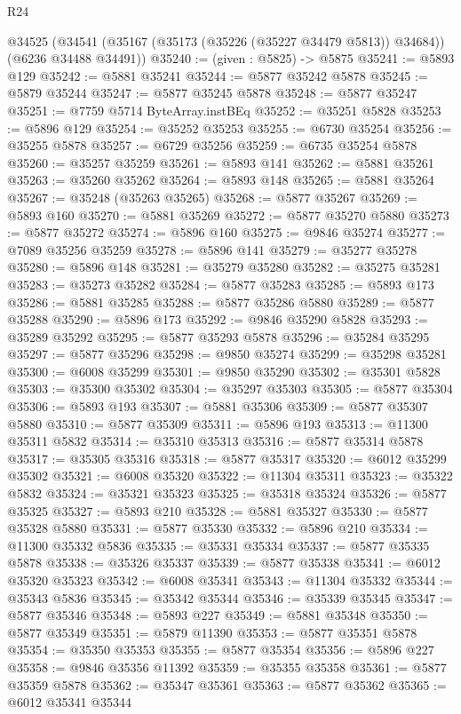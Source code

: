 \begin{lexlean}{R24}
\begin{coremodule}
  @34525 (@34541 (@35167 (@35173 (@35226 (@35227 @34479 @5813)) @34684)) (@6236 @34488 @34491))
@35240 := (given : @5825) -> @5875
@35241 := @5893 @129
@35242 := @5881 @35241
@35244 := @5877 @35242 @5878
@35245 := @5879 @35244
@35247 := @5877 @35245 @5878
@35248 := @5877 @35247
@35251 := @7759 @5714 ByteArray.instBEq
@35252 := @35251 @5828
@35253 := @5896 @129
@35254 := @35252 @35253
@35255 := @6730 @35254
@35256 := @35255 @5878
@35257 := @6729 @35256
@35259 := @6735 @35254 @5878
@35260 := @35257 @35259
@35261 := @5893 @141
@35262 := @5881 @35261
@35263 := @35260 @35262
@35264 := @5893 @148
@35265 := @5881 @35264
@35267 := @35248 (@35263 @35265)
@35268 := @5877 @35267
@35269 := @5893 @160
@35270 := @5881 @35269
@35272 := @5877 @35270 @5880
@35273 := @5877 @35272
@35274 := @5896 @160
@35275 := @9846 @35274
@35277 := @7089 @35256 @35259
@35278 := @5896 @141
@35279 := @35277 @35278
@35280 := @5896 @148
@35281 := @35279 @35280
@35282 := @35275 @35281
@35283 := @35273 @35282
@35284 := @5877 @35283
@35285 := @5893 @173
@35286 := @5881 @35285
@35288 := @5877 @35286 @5880
@35289 := @5877 @35288
@35290 := @5896 @173
@35292 := @9846 @35290 @5828
@35293 := @35289 @35292
@35295 := @5877 @35293 @5878
@35296 := @35284 @35295
@35297 := @5877 @35296
@35298 := @9850 @35274
@35299 := @35298 @35281
@35300 := @6008 @35299
@35301 := @9850 @35290
@35302 := @35301 @5828
@35303 := @35300 @35302
@35304 := @35297 @35303
@35305 := @5877 @35304
@35306 := @5893 @193
@35307 := @5881 @35306
@35309 := @5877 @35307 @5880
@35310 := @5877 @35309
@35311 := @5896 @193
@35313 := @11300 @35311 @5832
@35314 := @35310 @35313
@35316 := @5877 @35314 @5878
@35317 := @35305 @35316
@35318 := @5877 @35317
@35320 := @6012 @35299 @35302
@35321 := @6008 @35320
@35322 := @11304 @35311
@35323 := @35322 @5832
@35324 := @35321 @35323
@35325 := @35318 @35324
@35326 := @5877 @35325
@35327 := @5893 @210
@35328 := @5881 @35327
@35330 := @5877 @35328 @5880
@35331 := @5877 @35330
@35332 := @5896 @210
@35334 := @11300 @35332 @5836
@35335 := @35331 @35334
@35337 := @5877 @35335 @5878
@35338 := @35326 @35337
@35339 := @5877 @35338
@35341 := @6012 @35320 @35323
@35342 := @6008 @35341
@35343 := @11304 @35332
@35344 := @35343 @5836
@35345 := @35342 @35344
@35346 := @35339 @35345
@35347 := @5877 @35346
@35348 := @5893 @227
@35349 := @5881 @35348
@35350 := @5877 @35349
@35351 := @5879 @11390
@35353 := @5877 @35351 @5878
@35354 := @35350 @35353
@35355 := @5877 @35354
@35356 := @5896 @227
@35358 := @9846 @35356 @11392
@35359 := @35355 @35358
@35361 := @5877 @35359 @5878
@35362 := @35347 @35361
@35363 := @5877 @35362
@35365 := @6012 @35341 @35344

\end{coremodule}
\end{lexlean}
